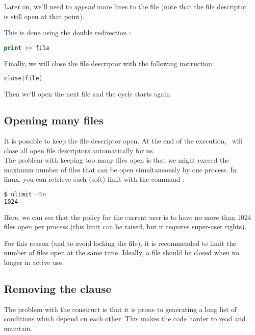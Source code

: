 \medskip


Later on, we'll need to \emph{append} more lines to the file (note that the file descriptor is still open at that point).

This is done using the double redirection \cmd{>>} :

\begin{lstlisting}[language=awk]
print >> file
\end{lstlisting}

\medskip


Finally, we will close the file descriptor with the following instruction:
\begin{lstlisting}[language=awk]
close(file)
\end{lstlisting}

Then we'll open the next file and the cycle starts again.



\subsection*{Opening many files}


It is possible to keep the file descriptor open. At the end of the execution, \awk\ will close all open file descriptors automatically for us. \\

The problem with keeping too many files open is that we might exceed the maximum number of files that can be open simultaneously by one process. In linux, you can retrieve such (soft) limit with the command  :
\begin{lstlisting}[language=sh]
$ ulimit -Sn
1024
\end{lstlisting}

Here, we can see that the policy for the current user is to have no more than 1024 files open per process (this limit can be raised, but it requires super-user rights).

For this reason (and to avoid locking the file), it is recommended to limit the number of files open at the same time. Ideally, a file should be closed when no longer in active use.


\newpage
\subsection*{Removing the  clause}

The problem with the  construct is that it is prone to generating a long list of conditions which depend on each other. This makes the code harder to read and maintain. \\

